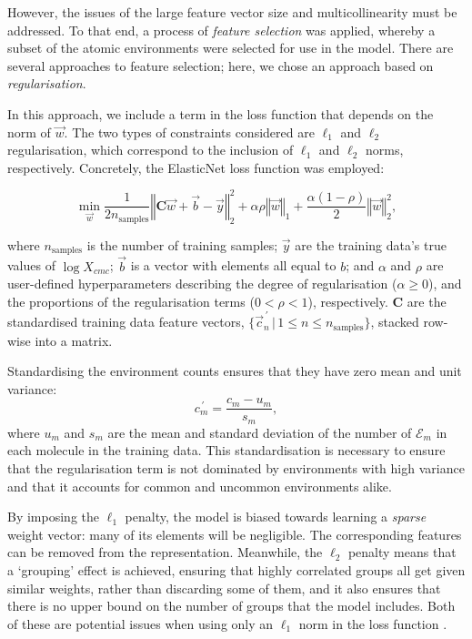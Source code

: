 However, the issues of the large feature vector size and multicollinearity must
be addressed. To that end, a process of \emph{feature selection} was applied,
whereby a subset of the atomic environments were selected for use in the model.
There are several approaches to feature
selection\cite{liFeatureSelectionData2017}; here, we chose an approach based on
\emph{regularisation}.

In this approach, we include a term in the loss function that depends on the
norm of $\vec{w}$. The two types of constraints considered are $\ell_1$ and
$\ell_2$ regularisation, which correspond to the inclusion of $\ell_1$ and
$\ell_2$ norms, respectively. Concretely, the ElasticNet
\cite{zouRegularizationVariableSelection2005} loss function was employed:

\begin{equation}
    \label{eq:elastic}
    \min_{\vec{w}} { \frac{1}{2n_{\text{samples}}} \left \Vert \mathbf{C}\vec{w} + \vec{b}- \vec{y} \right \Vert_2 ^ 2 + \alpha\rho \left \Vert \vec{w} \right \Vert_1} + \frac{\alpha(1 - \rho)}{2} \left \Vert \vec{w} \right \Vert_2^2,
\end{equation}

where $n_{\text{samples}}$ is the number of training samples; $\vec{y}$ are the
training data's true values of $\log X_{cmc}$; $\vec{b}$ is a vector with
elements all equal to $b$; and $\alpha$ and $\rho$ are user-defined
hyperparameters describing the degree of regularisation ($\alpha \geq 0$), and
the proportions of the regularisation terms ($0 < \rho < 1$), respectively.
$\mathbf{C}$ are the standardised training data feature vectors,
$\{\vec{c}^{\,\prime}_n \,|\, 1 \leq n \leq n_\text{samples}\}$, stacked
row-wise into a matrix.

Standardising the environment counts ensures that they have zero mean and unit variance:
\begin{equation}
    \label{eq:standard-scaling}
    {c}^{\,\prime}_m = \frac{c_m - u_m}{s_m},
\end{equation}
where $u_m$ and $s_m$ are the mean and standard deviation of the number of $\mathcal{E}_m$ in each molecule in the training data. This standardisation is necessary to ensure that the regularisation term is not dominated by
environments with high variance and that it accounts for common and uncommon environments alike.

By imposing the $\ell_1$ penalty, the model is biased towards learning a
\emph{sparse} weight vector: many of its elements will be negligible. The
corresponding features can be removed from the representation. Meanwhile, the
$\ell_2$ penalty means that a `grouping' effect is achieved, ensuring that
highly correlated groups all get given similar weights, rather than discarding
some of them, and it also ensures that there is no upper bound on the number of
groups that the model includes. Both of these are potential issues when using
only an $\ell_1$ norm in the loss function
\cite{efronLeastAngleRegression2004,zouRegularizationVariableSelection2005}.

